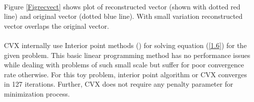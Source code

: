 \paragraph{}Figure \ref{Figrecvect} shows plot of reconstructed vector (shown with dotted red line) and
original vector (dotted blue line). With small variation reconstructed vector overlaps the original
vector.
\paragraph{}CVX internally use Interior point methods (\cite{karmarkar}) for solving equation (\ref{1.6}) for the given problem.
This basic linear programming method has no performance issues while dealing with problems of such small scale
but suffer for poor convergence rate otherwise. For this toy problem, interior point algorithm or CVX converges in 
127 iterations. Further, CVX does not require any penalty parameter for minimization process. 

